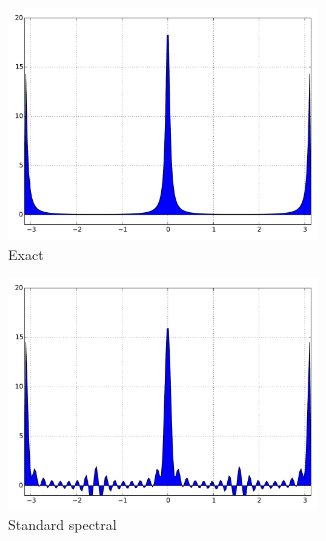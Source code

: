 \documentclass[final,leqno]{siamltex1213}
\begin{document}
\begin{figure}
	\hspace*{-.5cm}
	\begin{subfigure}{0.36\textwidth}
		\includegraphics[width=0.9\textwidth]{./images/exact_1D.pdf}
		\caption{Exact}
		\label{fig:exact}
	\end{subfigure}
	\hspace*{-.65cm}
	\begin{subfigure}{0.36\textwidth}
		\includegraphics[width=0.9\textwidth]{./images/standard_spectral_1D.pdf}
		\caption{Standard spectral}
		\label{fig:standard spectral}
	\end{subfigure}
	\hspace*{-.65cm}
	\begin{subfigure}{0.36\textwidth}

\end{subfigure}
\end{figure}
\end{document}

